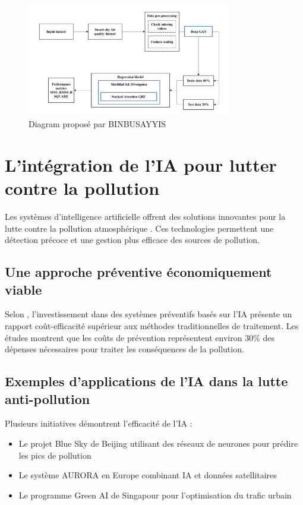 \documentclass[12pt,a4paper]{report}
\begin{document}
\begin{figure}[h]
    \centering
    \includegraphics[width=0.8\textwidth]{diagram1.png}
    \caption{Diagram proposé par BINBUSAYYIS}
    \label{fig:Diagram}
\end{figure}
\section{L'intégration de l'IA pour lutter contre la pollution}
Les systèmes d'intelligence artificielle offrent des solutions innovantes pour la lutte contre la pollution atmosphérique \cite{Chen2019}. Ces technologies permettent une détection précoce et une gestion plus efficace des sources de pollution.

\subsection{Une approche préventive économiquement viable}
Selon \cite{Wang2021}, l'investissement dans des systèmes préventifs basés sur l'IA présente un rapport coût-efficacité supérieur aux méthodes traditionnelles de traitement. Les études montrent que les coûts de prévention représentent environ 30\% des dépenses nécessaires pour traiter les conséquences de la pollution.

\subsection{Exemples d'applications de l'IA dans la lutte anti-pollution}
Plusieurs initiatives démontrent l'efficacité de l'IA :
\begin{itemize}
    \item Le projet Blue Sky de Beijing utilisant des réseaux de neurones pour prédire les pics de pollution \cite{Liu2020}
    \item Le système AURORA en Europe combinant IA et données satellitaires \cite{Kumar2021}
    \item Le programme Green AI de Singapour pour l'optimisation du trafic urbain \cite{Zhang2022}
\end{itemize}
\end{document}
